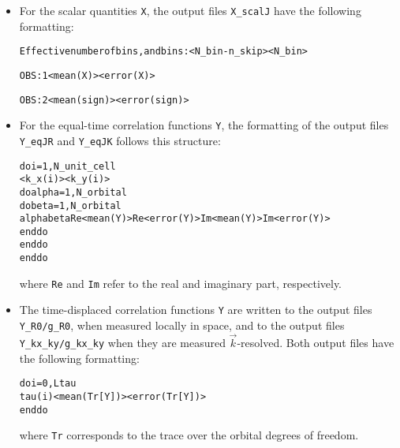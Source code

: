 \begin{itemize}
\item For the scalar quantities \texttt{X}, the output files  \texttt{X\_scalJ} have the following formatting:
\begin{alltt}
Effective number of bins, and bins:           <N_bin - n_skip>          <N_bin>

OBS :    1      <mean(X)>      <error(X)>

OBS :    2      <mean(sign)>   <error(sign)>
\end{alltt}

\item For the equal-time correlation functions \texttt{Y}, the formatting of the output files \texttt{Y\_eqJR} and \texttt{Y\_eqJK} follows this structure:
\begin{alltt}
do i = 1, N_unit_cell
   <k_x(i)>   <k_y(i)>
   do alpha = 1, N_orbital
   do beta  = 1, N_orbital
      alpha   beta   Re<mean(Y)>   Re<error(Y)>   Im<mean(Y)>   Im<error(Y)>
   enddo
   enddo
enddo
\end{alltt}
where \texttt{Re} and \texttt{Im} refer to the real and imaginary part, respectively.

\item The time-displaced correlation functions \texttt{Y} are written to the output files \texttt{Y\_R0/g\_R0}, when measured locally in space, 
and to the output files \texttt{Y\_kx\_ky/g\_kx\_ky} when they are measured $\vec{k}$-resolved. 
Both output files have the following formatting:
\begin{alltt}
do i = 0, Ltau
   tau(i)   <mean( Tr[Y] )>   <error( Tr[Y])>
enddo
\end{alltt}
where \texttt{Tr} corresponds to the trace over the orbital degrees of freedom.

\end{itemize}
